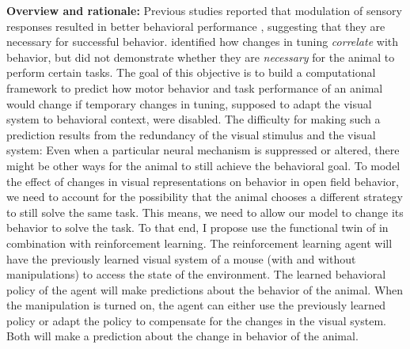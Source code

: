 \documentclass[B2,COG]{ercgrant}
\begin{document}
\textbf{Overview and rationale:} 
Previous studies reported that modulation of sensory responses resulted in better behavioral performance \parencite{Spitzer1988-kq, Bennett2013-rk, Dadarlat2017-jw, De_Gee2022-ir}, suggesting that they are necessary for successful behavior. 
 identified how changes in tuning \textit{correlate} with behavior, but did not demonstrate whether they are \textit{necessary} for the animal to perform certain tasks.
The goal of this objective is to build a computational framework to predict how motor behavior and task performance of an animal would change if temporary changes in tuning, supposed to adapt the visual system to behavioral context, were disabled.  
The difficulty for making such a prediction results from the redundancy of the visual stimulus and the visual system: 
Even when a particular neural mechanism is suppressed or altered, there might be other ways for the animal to still achieve the behavioral goal. 
To model the effect of changes in visual representations on behavior in open field behavior, we need to account for the possibility that the animal chooses a different strategy to still solve the same task. 
This means, we need to allow our model to change its behavior to solve the task. 
To that end, I propose use the functional twin of in combination with reinforcement learning.
The reinforcement learning agent will have the previously learned visual system of a mouse (with and without manipulations) to access the state of the environment.
The learned behavioral policy of the agent will make predictions about the behavior of the animal. 
When the manipulation is turned on, the agent can either use the previously learned policy or adapt the policy to compensate for the changes in the visual system.
Both will make a prediction about the change in behavior of the animal. 
\end{document}
